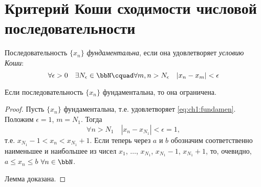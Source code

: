 \section{Критерий Коши сходимости числовой последовательности}

\begin{defn}
Последовательность $\{x_n\}$ \textit{фундаментальна}, если она удовлетворяет \textit{условию Коши}:
\begin{equation}
\label{eq:ch1:fundamen}
\forall \epsilon >0 \quad \exists N_{\epsilon} \in \bbN\cquad \forall m,n > N_{\epsilon}\quad |x_n-x_m|<\epsilon  
\end{equation}
\end{defn}

\begin{lemm}
\label{lm:ch1:fundamendal}
Если последовательность $\{x_n\}$ фундаментальна, то она ограничена.
\end{lemm}
\begin{proof}
Пусть $\{x_n\}$ фундаментальна, т.е. удовлетворяет \eqref{eq:ch1:fundamen}. Положим $\epsilon = 1$, $m = N_1$. Тогда $$\forall n > N_1\quad |x_n-x_{N_1}| <\epsilon = 1,$$ т.е. $x_{N_1} - 1< x_n < x_{N_1}+1$. Если теперь через $a$ и $b$ обозначим соответственно наименьшее и наибольшее из чисел $x_1$, $\dots$, $x_{N_1}$, $x_{N_1}-1$, $x_{N_1}+1$, то, очевидно, $a \le x_n \le b$ $\forall n \in \bbN$.

Лемма доказана.
\end{proof}


